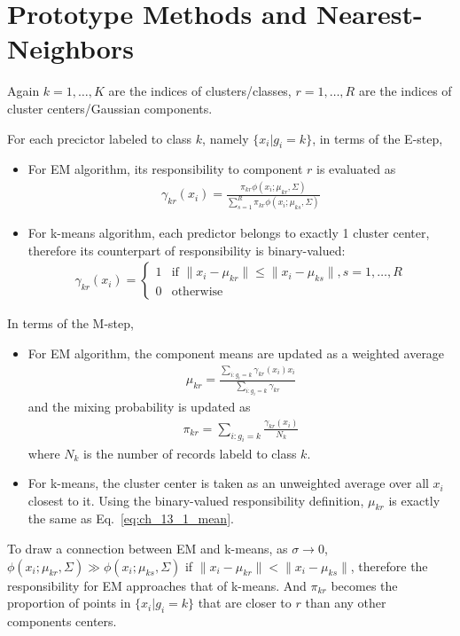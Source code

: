 \chapter{Prototype Methods and Nearest-Neighbors}
\label{ch:13}

\begin{exercise}
  Again $k = 1,\ldots,K$ are the indices of clusters/classes, $r = 1,\ldots,R$
  are the indices of cluster centers/Gaussian components.
  
  For each precictor labeled to class $k$, namely $\{x_i|g_i = k\}$, in terms of
  the E-step,
  \begin{itemize}
    \item For EM algorithm, its responsibility to component $r$ is evaluated as
    \begin{align}
      \gamma_{kr}(x_i) =
      \frac{\pi_{kr}\phi(x_i;\mu_{kr},\Sigma)}
      {\sum_{s=1}^R\pi_{kr}\phi(x_i;\mu_{ks},\Sigma)}
    \end{align}
    \item For k-means algorithm, each predictor belongs to exactly 1 cluster
    center, therefore its counterpart of responsibility is binary-valued:
    \begin{align}
      \gamma_{kr}(x_i) = \left\{
        \begin{array}{ll}
          1 & \mbox{if } \|x_i - \mu_{kr}\| \leq \|x_i - \mu_{ks}\|,
          s=1,\ldots,R \\
          0 & \mbox{otherwise}
        \end{array}
      \right.
    \end{align}
  \end{itemize}
  
  In terms of the M-step,
  \begin{itemize}
    \item For EM algorithm, the component means are updated as a weighted
    average
    \begin{align}
      \mu_{kr} =
      \frac{\sum_{i:g_i=k}\gamma_{kr}(x_i)x_i}{\sum_{i:g_i=k}\gamma_{kr}}
      \label{eq:ch_13_1_mean}
    \end{align}
    and the mixing probability is updated as
    \begin{align}
      \pi_{kr} = \sum_{i:g_i=k}\frac{\gamma_{kr}(x_i)}{N_{k}}
    \end{align}
    where $N_k$ is the number of records labeld to class $k$.
    \item For k-means, the cluster center is taken as an unweighted average over
    all $x_i$ closest to it. Using the binary-valued responsibility definition,
    $\mu_{kr}$ is exactly the same as Eq.~\eqref{eq:ch_13_1_mean}.
  \end{itemize}
  To draw a connection between EM and k-means, as $\sigma\rightarrow 0$,
  $\phi(x_i;\mu_{kr},\Sigma)\gg\phi(x_i;\mu_{ks},\Sigma)$ if $\|x_i - \mu_{kr}\|
  < \|x_i - \mu_{ks}\|$, therefore the responsibility for EM approaches that of
  k-means. And $\pi_{kr}$ becomes the proportion of points in $\{x_i|g_i = k\}$
  that are closer to $r$ than any other components centers.
\end{exercise}

